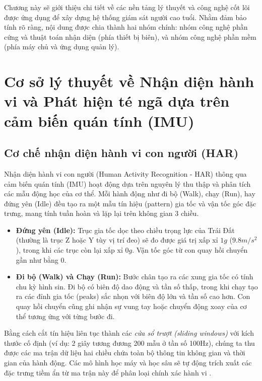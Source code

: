 \documentclass[../DoAn.tex]{subfiles}
\begin{document}
Chương này sẽ giới thiệu chi tiết về các nền tảng lý thuyết và công nghệ cốt lõi được ứng dụng để xây dựng hệ thống giám sát người cao tuổi. Nhằm đảm bảo tính rõ ràng, nội dung được chia thành hai nhóm chính: nhóm công nghệ phần cứng và thuật toán nhận diện (phía thiết bị biên), và nhóm công nghệ phần mềm (phía máy chủ và ứng dụng quản lý).

\section{Cơ sở lý thuyết về Nhận diện hành vi và Phát hiện té ngã dựa trên cảm biến quán tính (IMU)}
\label{section:3.1}

\subsection{Cơ chế nhận diện hành vi con người (HAR)}
Nhận diện hành vi con người (Human Activity Recognition - HAR) thông qua cảm biến quán tính (IMU) hoạt động dựa trên nguyên lý thu thập và phân tích các mẫu động học của cơ thể. Mỗi hành động như đi bộ (Walk), chạy (Run), hay đứng yên (Idle) đều tạo ra một mẫu tín hiệu (pattern) gia tốc và vận tốc góc đặc trưng, mang tính tuần hoàn và lặp lại trên không gian 3 chiều.
\begin{itemize}
    \item \textbf{Đứng yên (Idle):} Trục gia tốc dọc theo chiều trọng lực của Trái Đất (thường là trục Z hoặc Y tùy vị trí đeo) sẽ đo được giá trị xấp xỉ $1g$ ($9.8 m/s^2$), trong khi các trục còn lại xấp xỉ $0g$. Vận tốc góc từ con quay hồi chuyển gần như bằng 0.
    \item \textbf{Đi bộ (Walk) và Chạy (Run):} Bước chân tạo ra các xung gia tốc có tính chu kỳ hình sin. Đi bộ có biên độ dao động và tần số thấp, trong khi chạy tạo ra các đỉnh gia tốc (peaks) sắc nhọn với biên độ lớn và tần số cao hơn. Con quay hồi chuyển cũng ghi nhận sự vung tay hoặc chuyển động xoay của cơ thể tương ứng với từng bước đi.
\end{itemize}

Bằng cách cắt tín hiệu liên tục thành các \textit{cửa sổ trượt (sliding windows)} với kích thước cố định (ví dụ: 2 giây tương đương 200 mẫu ở tần số 100Hz), chúng ta thu được các ma trận dữ liệu hai chiều chứa toàn bộ thông tin không gian và thời gian của hành động. Các mô hình học máy và học sâu sẽ tự động trích xuất các đặc trưng tiềm ẩn từ ma trận này để phân loại chính xác hành vi \cite{nazar2025csohm, booranawong2025stairs}.
\end{document}
